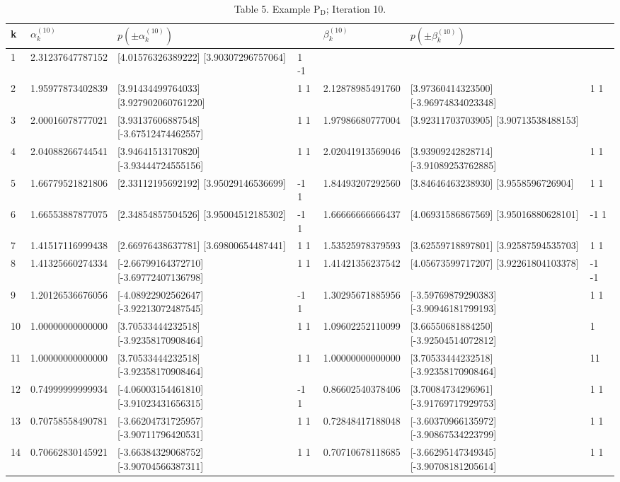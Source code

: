\documentclass[10pt]{article}
\begin{document}
\begin{table}[h]
\begin{center}
\captionsetup{labelformat=empty}
\caption{Table 5. Example $\mathrm{P}_{\mathrm{D}}$; Iteration 10.}
\begin{tabular}{|l|l|l|l|l|l|l|}
\hline
k & $\alpha_{k}^{(10)}$ & $p\left( \pm \alpha_{k}^{(10)}\right)$ &  & $\beta_{k}^{(10)}$ & $p\left( \pm \beta_{k}^{(10)}\right)$ &  \\
\hline
1 & 2.31237647787152 & [4.01576326389222] [3.90307296757064] & 1 -1 &  &  &  \\
\hline
2 & 1.95977873402839 & [3.91434499764033] [3.927902060761220] & 1 1 & 2.12878985491760 & [3.97360414323500] [-3.96974834023348] & 1 1 \\
\hline
3 & 2.00016078777021 & [3.93137606887548] [-3.67512474462557] & 1 1 & 1.97986680777004 & [3.92311703703905] [3.90713538488153] &  \\
\hline
4 & 2.04088266744541 & [3.94641513170820] [-3.93444724555156] & 1 1 & 2.02041913569046 & [3.93909242828714] [-3.91089253762885] & 1 1 \\
\hline
5 & 1.66779521821806 & [2.33112195692192] [3.95029146536699] & -1 1 & 1.84493207292560 & [3.84646463238930] [3.9558596726904] & 1 1 \\
\hline
6 & 1.66553887877075 & [2.34854857504526] [3.95004512185302] & -1 1 & 1.66666666666437 & [4.06931586867569] [3.95016880628101] & -1 1 \\
\hline
7 & 1.41517116999438 & [2.66976438637781] [3.69800654487441] & 1 1 & 1.53525978379593 & [3.62559718897801] [3.92587594535703] & 1 1 \\
\hline
8 & 1.41325660274334 & [-2.66799164372710] [-3.69772407136798] & 1 1 & 1.41421356237542 & [4.05673599717207] [3.92261804103378] & -1 -1 \\
\hline
9 & 1.20126536676056 & [-4.08922902562647] [-3.92213072487545] & -1 1 & 1.30295671885956 & [-3.59769879290383] [-3.90946181799193] & 1 1 \\
\hline
10 & 1.00000000000000 & [3.70533444232518] [-3.92358170908464] & 1 1 & 1.09602252110099 & [3.66550681884250] [-3.92504514072812] & 1 \\
\hline
11 & 1.00000000000000 & [3.70533444232518] [-3.92358170908464] & 1 1 & 1.00000000000000 & [3.70533444232518] [-3.92358170908464] & 11 \\
\hline
12 & 0.74999999999934 & [-4.06003154461810] [-3.91023431656315] & -1 1 & 0.86602540378406 & [3.70084734296961] [-3.91769717929753] & 1 1 \\
\hline
13 & 0.70758558490781 & [-3.66204731725957] [-3.90711796420531] & 1 1 & 0.72848417188048 & [-3.60370966135972] [-3.90867534223799] & 1 1 \\
\hline
14 & 0.70662830145921 & [-3.66384329068752] [-3.90704566387311] & 1 1 & 0.70710678118685 & [-3.66295147349345] [-3.90708181205614] & 1 1 \\
\hline
\end{tabular}
\end{center}
\end{table}
\end{document}
